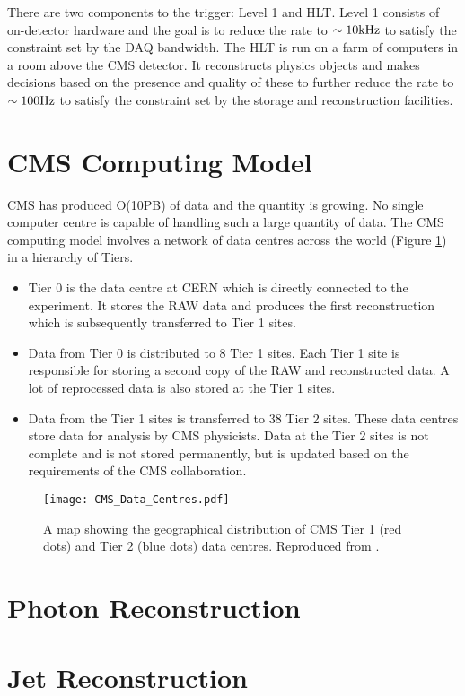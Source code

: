 There are two components to the trigger: Level 1 and HLT. Level 1 consists of
on-detector hardware and the goal is to reduce the rate to $\sim 10\mbox{kHz}$ to
satisfy the constraint set by the DAQ bandwidth. The HLT is run on a farm of 
computers in a room above the CMS detector. It reconstructs physics objects 
and makes decisions based on the presence and quality of these to further reduce
the rate to $\sim 100\mbox{Hz}$ to satisfy the constraint set by the storage and 
reconstruction facilities.

\section{CMS Computing Model}

CMS has produced O(10PB) of data and the quantity is growing. No single computer
centre is capable of handling such a large quantity of data. The CMS computing
model involves a network of data centres across the world (Figure 
\ref{fig:CMS_Data_Centres}) in a hierarchy of Tiers. 

\begin{itemize}
\item Tier 0 is the data centre at CERN which is directly connected to the
experiment. It stores the RAW data and produces the first reconstruction which
is subsequently transferred to Tier 1 sites. 
\item Data from Tier 0 is distributed to 8 Tier 1 sites. Each Tier 1 site is 
responsible for storing a second copy of the RAW and reconstructed data. A lot 
of reprocessed data is also stored at the Tier 1 sites. 
\item Data from the Tier 1 sites is transferred to 38 Tier 2 sites. These data
centres store data for analysis by CMS physicists. Data at the Tier 2 sites is
not complete and is not stored permanently, but is updated based on the
requirements of the CMS collaboration. 
\end{itemize}

\begin{figure}
\texttt{[image: CMS\_Data\_Centres.pdf]}
\label{fig:CMS_Data_Centres}
\caption{A map showing the geographical distribution of CMS Tier 1 (red dots)
and Tier 2 (blue dots) data centres. Reproduced from \cite{grid}.}
\end{figure}

\section{Photon Reconstruction}

\section{Jet Reconstruction}
